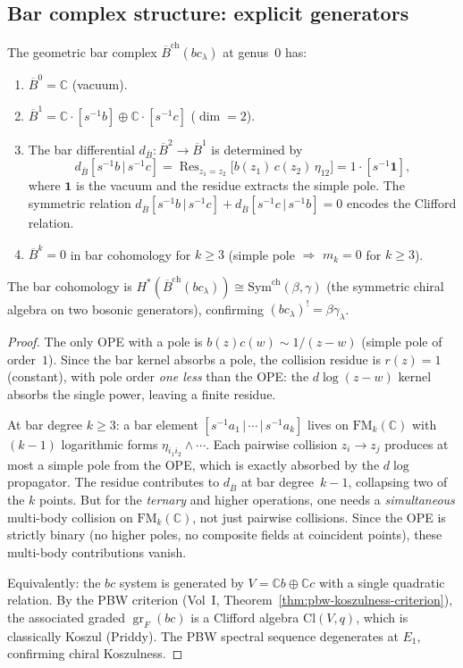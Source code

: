 \documentclass[11pt]{article}
\newcommand{\barB}{\overline{B}}
\newcommand{\C}{\mathbb{C}}
\newcommand{\Res}{\operatorname{Res}}
\newcommand{\FM}{\mathrm{FM}}
\DeclareMathOperator{\gr}{gr}
\begin{document}
\subsection{Bar complex structure: explicit generators}

\begin{proposition}
\label{prop:bar-bc-genus0}
The geometric bar complex $\barB^{\mathrm{ch}}(bc_\lambda)$ at
genus~$0$ has:
\begin{enumerate}
\item $\barB^0 = \C$ (vacuum).
\item $\barB^1 = \C \cdot [s^{-1}b] \oplus \C \cdot [s^{-1}c]$
  ($\dim = 2$).
\item The bar differential $d_{\barB}\colon \barB^2 \to \barB^1$
  is determined by
  \[
  d_{\barB}[s^{-1}b \,|\, s^{-1}c]
  = \Res_{z_1 = z_2}
    \bigl[b(z_1)\,c(z_2)\,\eta_{12}\bigr]
  = 1 \cdot [s^{-1}\mathbf{1}],
  \]
  where $\mathbf{1}$ is the vacuum and the residue extracts the
  simple pole.  The symmetric relation
  $d_{\barB}[s^{-1}b \,|\, s^{-1}c]
  + d_{\barB}[s^{-1}c \,|\, s^{-1}b] = 0$
  encodes the Clifford relation.
\item $\barB^k = 0$ in bar cohomology for $k \ge 3$
  (simple pole $\Rightarrow$ $m_k = 0$ for $k \ge 3$).
\end{enumerate}
The bar cohomology is
$H^*(\barB^{\mathrm{ch}}(bc_\lambda))
\cong \mathrm{Sym}^{\mathrm{ch}}(\beta, \gamma)$
(the symmetric chiral algebra on two bosonic generators),
confirming $(bc_\lambda)^! = \beta\gamma_\lambda$.
\end{proposition}

\begin{proof}
The only OPE with a pole is $b(z)c(w) \sim 1/(z{-}w)$
(simple pole of order~$1$).  Since the bar kernel absorbs
a pole, the collision residue is $r(z) = 1$ (constant),
with pole order \emph{one less} than the OPE: the
$d\log(z{-}w)$ kernel absorbs the single power, leaving a
finite residue.

At bar degree $k \ge 3$: a bar element
$[s^{-1}a_1 \,|\, \cdots \,|\, s^{-1}a_k]$ lives on
$\FM_k(\C)$ with $(k{-}1)$ logarithmic forms
$\eta_{i_1 i_2} \wedge \cdots$.  Each pairwise collision
$z_i \to z_j$ produces at most a simple pole from the OPE,
which is exactly absorbed by the $d\log$ propagator.  The
residue contributes to $d_{\barB}$ at bar degree~$k{-}1$,
collapsing two of the $k$ points.  But for the \emph{ternary}
and higher operations, one needs a \emph{simultaneous}
multi-body collision on $\FM_k(\C)$, not just pairwise
collisions.  Since the OPE is strictly binary (no higher
poles, no composite fields at coincident points), these
multi-body contributions vanish.

Equivalently: the $bc$ system is generated by $V = \C b
\oplus \C c$ with a single quadratic relation.  By the PBW
criterion (Vol~I, Theorem~\ref*{thm:pbw-koszulness-criterion}),
the associated graded $\gr_F(bc)$ is a Clifford algebra
$\mathrm{Cl}(V, q)$, which is classically Koszul (Priddy).
The PBW spectral sequence degenerates at $E_1$, confirming
chiral Koszulness.
\end{proof}
\end{document}
